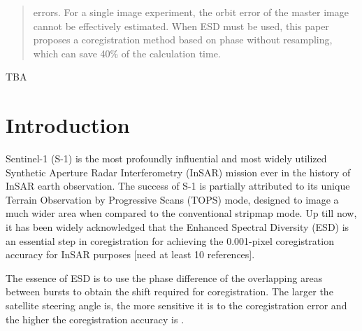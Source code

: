 \documentclass[preprint, authoryear]{elsarticle}
\begin{document}
\begin{frontmatter}
\begin{abstract}
errors. For a single image experiment, the orbit error of the master image cannot be effectively estimated. When ESD must be used, this paper proposes a coregistration method based on phase without resampling, which can save 40\% of the calculation time.
%
\end{abstract}

\begin{keyword}
TBA
%
\end{keyword}

\end{frontmatter}




\section{Introduction}

Sentinel-1 (S-1) is the most profoundly influential and most widely utilized Synthetic Aperture Radar Interferometry (InSAR) mission ever in the history of InSAR earth observation. The success of S-1 is partially attributed to its unique Terrain Observation by Progressive Scans (TOPS) mode, designed to image a much wider area when compared to the conventional stripmap mode. Up till now, it has been widely acknowledged that the Enhanced Spectral Diversity (ESD) is an essential step in coregistration for achieving the 0.001-pixel coregistration accuracy for InSAR purposes [need at least 10 references].


The essence of ESD is to use the phase difference of the overlapping areas between bursts to obtain the shift required for coregistration. The larger the satellite steering angle is, the more sensitive it is to the coregistration error and the higher the coregistration accuracy is \cite{TOPS_Interferometry_With_TerraSAR-X}.
\end{document}
